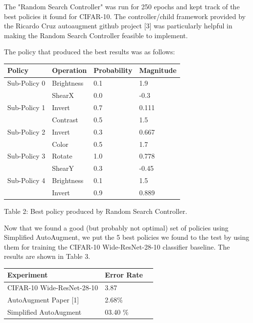 \documentclass[10pt,twocolumn,letterpaper]{article}
\begin{document}
The "Random Search Controller" was run for 250 epochs and kept track of the best policies it found for CIFAR-10. The controller/child framework provided by the Ricardo Cruz autoaugment github project [3] was particularly helpful in making the Random Search Controller feasible to implement.

The policy that produced the best results was as follows:

		\begin{table}[h]
			\begin{tabular}{llll}
				\hline
				Policy &Operation &Probability&Magnitude   \\ \hline
				Sub-Policy 0 &Brightness &0.1&1.9\\
				&ShearX &0.0 &-0.3\\

				Sub-Policy 1 &Invert &0.7&0.111\\
				&Contrast &0.5 &1.5\\

				Sub-Policy 2 &Invert &0.3&0.667\\
				&Color &0.5 &1.7\\

				Sub-Policy 3 &Rotate &1.0&0.778\\
				&ShearY &0.3 &-0.45\\

				Sub-Policy 4 &Brightness &0.1&1.5\\
				&Invert &0.9 &0.889\\
				\hline
			\end{tabular}
		\end{table}

Table 2: Best policy produced by Random Search Controller.

Now that we found a good (but probably not optimal) set of policies using Simplified AutoAugment, we put the 5 best policies we found to the test by using them for training the CIFAR-10 Wide-ResNet-28-10 classifier baseline.  The results are shown in Table 3.

\vfill\null 

    \begin{table}[h]
      \begin{tabular}{lll}
        \hline
        Experiment &Error Rate  \\ \hline
        CIFAR-10 Wide-ResNet-28-10  &3.87\\
        AutoAugment Paper [1]  &2.68\% \\ 
        Simplified AutoAugment &03.40  \%\\
        \hline
      \end{tabular}
    \end{table}
\end{document}
